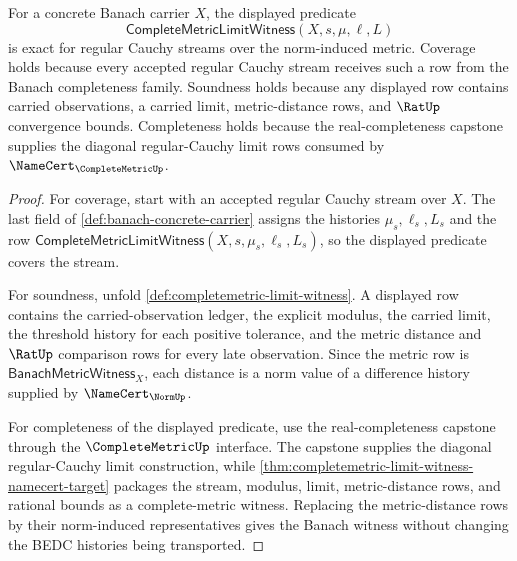 \begin{theorem}
\label{thm:banach-complete-metric-witness-exactness}
For a concrete Banach carrier $X$, the displayed predicate
$$
\mathsf{CompleteMetricLimitWitness}(X,s,\mu,\ell,L)
$$
is exact for regular Cauchy streams over the norm-induced metric. Coverage
holds because every accepted regular Cauchy stream receives such a row from
the Banach completeness family. Soundness holds because any displayed row
contains carried observations, a carried limit, metric-distance rows, and
$\RatUp$ convergence bounds. Completeness holds because the real-completeness
capstone supplies the diagonal regular-Cauchy limit rows consumed by
$\NameCert_{\CompleteMetricUp}$.
\end{theorem}
\begin{proof}
For coverage, start with an accepted regular Cauchy stream over $X$. The last
field of \autoref{def:banach-concrete-carrier} assigns the histories
$\mu_s,\ell_s,L_s$ and the row
$\mathsf{CompleteMetricLimitWitness}(X,s,\mu_s,\ell_s,L_s)$, so the displayed
predicate covers the stream.

For soundness, unfold \autoref{def:completemetric-limit-witness}. A displayed
row contains the carried-observation ledger, the explicit modulus, the carried
limit, the threshold history for each positive tolerance, and the metric
distance and $\RatUp$ comparison rows for every late observation. Since the
metric row is $\mathsf{BanachMetricWitness}_X$, each distance is a norm value
of a difference history supplied by $\NameCert_{\NormUp}$.

For completeness of the displayed predicate, use the real-completeness
capstone through the $\CompleteMetricUp$ interface. The capstone supplies the
diagonal regular-Cauchy limit construction, while
\autoref{thm:completemetric-limit-witness-namecert-target} packages the
stream, modulus, limit, metric-distance rows, and rational bounds as a
complete-metric witness. Replacing the metric-distance rows by their
norm-induced representatives gives the Banach witness without changing the
BEDC histories being transported.
\end{proof}

